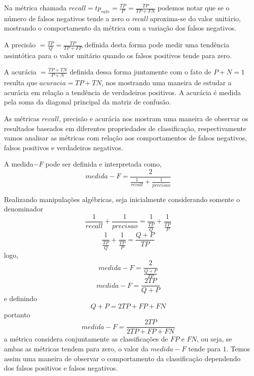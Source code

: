 Na métrica chamada $recall= tp_{rate}=\frac{TP}{P}=\frac{TP}{TP+FN}$ podemos notar que se o número de falsos negativos tende a zero o \textit{recall} aproxima-se do valor unitário, mostrando o comportamento da métrica com a variação dos falsos negativos.

A precisão $=\frac{TP}{Q}=\frac{TP}{TP+FP}$ definida desta forma pode medir uma tendência assintótica para o valor unitário quando os falsos positivos  tende para zero.  

A acurácia $= \frac{TP+TN}{P+N}$ definida dessa forma juntamente com o fato de $P+N=1$ resulta que $acuracia=TP+TN$, nos mostrando uma maneira de estudar a acurácia em relação a tendência de verdadeiros positivos. A acurácia é medida pela soma da diagonal principal da matriz de confusão.

As métricas $recall$, precisão e acurácia nos mostram uma maneira de observar os resultados baseados em diferentes propriedades de classificação, respectivamente vamos analisar as métricas com relação aos comportamentos de falsos negativos, falsos positivos e verdadeiros negativos.  

A medida$-F$ pode ser definida e interpretada como, 
\begin{equation}\nonumber
medida-F=\frac{2}{\frac{1}{recall}+\frac{1}{precisao}}
\end{equation}

Realizando manipulações algébricas, seja inicialmente considerando somente o denominador
\begin{equation}\nonumber
	\frac{1}{recall}+\frac{1}{precisao}=\frac{1}{\frac{TP}{Q}}+\frac{1}{\frac{TP}{P}}
\end{equation}
\begin{equation}\nonumber
	\frac{1}{\frac{TP}{Q}}+\frac{1}{\frac{TP}{P}} = \frac{Q+P}{TP}
\end{equation}
logo,
\begin{equation}\nonumber
	medida-F=\frac{2}{\frac{Q+P}{TP}}
\end{equation}
\begin{equation}\nonumber
	medida-F=\frac{2TP}{Q+P}
\end{equation}
e definindo
\begin{equation}\nonumber
     Q+P=2TP+FP+FN
\end{equation}
portanto
\begin{equation}\nonumber
	medida-F=\frac{2TP}{2TP+FP+FN}
\end{equation}
a métrica considera conjuntamente as classificações de $FP$ e $FN$, ou seja, se ambas as métricas tendem para zero, o valor da $medida-F$ tende para $1$. Temos assim uma maneira de observar o comportamento da classificação dependendo dos falsos positivos e falsos negativos.

